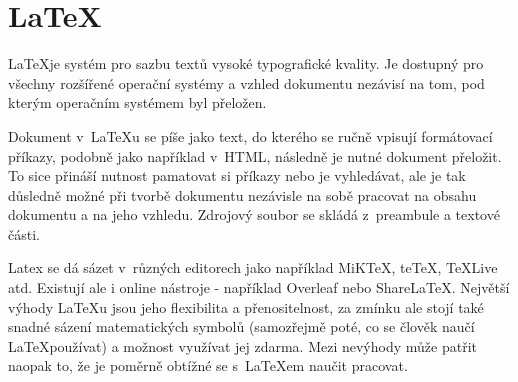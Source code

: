 \documentclass[a4paper, 11pt]{article}
\begin{document}
\section{\LaTeX}
\LaTeX je systém pro sazbu textů vysoké typografické kvality. Je dostupný pro všechny rozšířené operační systémy a vzhled dokumentu nezávisí na tom, pod kterým operačním systémem byl přeložen. 

Dokument v~\LaTeX u se píše jako text, do kterého se ručně vpisují formátovací příkazy, podobně jako například v~HTML, následně je nutné dokument přeložit. To sice přináší nutnost pamatovat si příkazy nebo je vyhledávat, ale je tak důsledně možné při tvorbě dokumentu nezávisle na sobě pracovat na obsahu dokumentu a na jeho vzhledu. Zdrojový soubor se skládá z~preambule a textové části. \cite{TheLatexCompanion}

Latex se dá sázet v~různých editorech jako například MiK\TeX, te\TeX, \TeX Live atd. \cite{Rybicka} Existují ale i online nástroje - například Overleaf nebo Share\LaTeX. Největší výhody \LaTeX u jsou jeho flexibilita a přenositelnost, za zmínku ale stojí také snadné sázení matematických symbolů (samozřejmě poté, co se člověk naučí \LaTeX používat) \cite{Sullivan} a možnost využívat jej zdarma. Mezi nevýhody může patřit naopak to, že je poměrně obtížné se s~\LaTeX em naučit pracovat. 


\newpage



\end{document}
